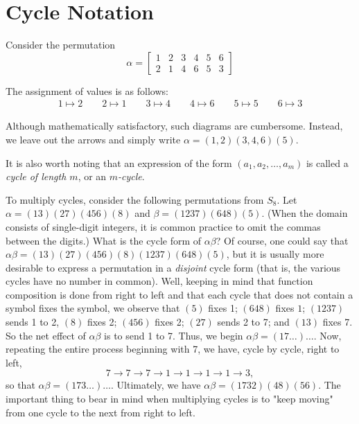 \section{Cycle Notation}
\begin{definition}
	Consider the permutation
	\[ \alpha = \begin{bmatrix}
			1 & 2 & 3 & 4 & 5 & 6 \\
			2 & 1 & 4 & 6 & 5 & 3
		\end{bmatrix}\]

	The assignment of values is as follows:
	\begin{align*}
		1 \mapsto 2 \qquad
        2 \mapsto 1 \qquad
        3 \mapsto 4 \qquad
        4 \mapsto 6 \qquad
        5 \mapsto 5 \qquad
        6 \mapsto 3
	\end{align*}

	Although mathematically satisfactory, such diagrams are cumbersome. Instead, we leave out the arrows and simply write $\alpha = (1,2)(3,4,6)(5)$.

	It is also worth noting that an expression of the form $(a_1, a_2, \dots, a_m)$ is called a \textit{cycle of length $m$}, or an \textit{$m$-cycle}.
\end{definition}
\begin{example}
	To multiply cycles, consider the following permutations from $S_8$. Let $\alpha = (13)(27)(456)(8)$ and $\beta = (1237)(648)(5)$. (When the domain consists of single-digit integers, it is common practice to omit the commas between the digits.) What is the cycle form of $\alpha\beta$? Of course, one could say that $\alpha\beta = (13)(27)(456)(8)(1237)(648)(5)$, but it is usually more desirable to express a permutation in a \textit{disjoint} cycle form (that is, the various cycles have no number in common). Well, keeping in mind that function composition is done from right to left and that each cycle that does not contain a symbol fixes the symbol, we observe that $(5)$ fixes 1; $(648)$ fixes $1$; $(1237)$ sends 1 to 2, $(8)$ fixes 2; $(456)$ fixes 2; $(27)$ sends 2 to 7; and $(13)$ fixes 7. So the net effect of $\alpha\beta$ is to send 1 to 7. Thus, we begin $\alpha\beta=(17\dots)\dots$. Now, repeating the entire process beginning with 7, we have, cycle by cycle, right to left,
	\[ 7 \to 7 \to 7 \to 1 \to 1 \to 1 \to 1 \to 3, \]
	so that $\alpha\beta = (173\dots)\dots$. Ultimately, we have $\alpha\beta = (1732)(48)(56)$. The important thing to bear in mind when multiplying cycles is to "keep moving" from one cycle to the next from right to left.
\end{example}
